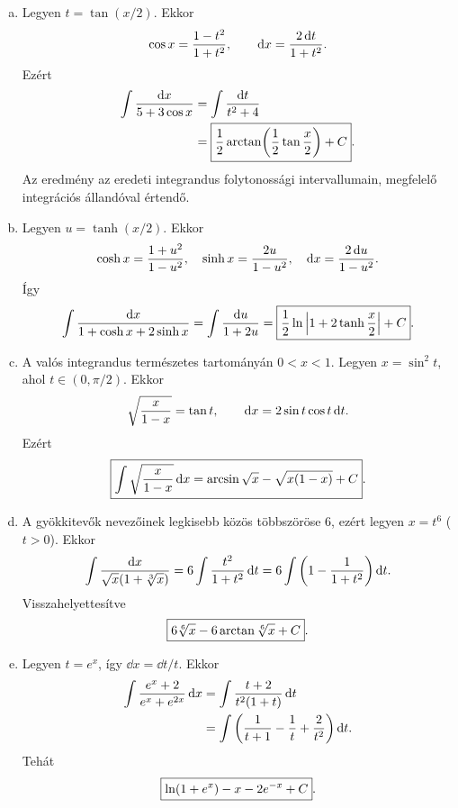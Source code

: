\documentclass{szb-solution}
\begin{document}
\begin{enumerate}[a)]
  \item Legyen $t=\tan(x/2)$. Ekkor
        $$
          \cos x=\frac{1-t^2}{1+t^2},
          \qquad
          \mathop{}\!\mathrm{d} x=\frac{2\mathop{}\!\mathrm{d} t}{1+t^2}
          \text.
        $$
        Ezért
        \begin{align*}
          \int\frac{\mathop{}\!\mathrm{d} x}{5+3\cos x}
          &=\int\frac{\mathop{}\!\mathrm{d} t}{t^2+4}\\
          &=\boxed{\frac12\arctan\!\left(
            \frac12\tan\frac{x}{2}\right)+C}
          \text.
        \end{align*}
        Az eredmény az eredeti integrandus folytonossági intervallumain,
        megfelelő integrációs állandóval értendő.

  \item Legyen $u=\tanh(x/2)$. Ekkor
        $$
          \cosh x=\frac{1+u^2}{1-u^2},
          \quad
          \sinh x=\frac{2u}{1-u^2},
          \quad
          \mathop{}\!\mathrm{d} x=\frac{2\mathop{}\!\mathrm{d} u}{1-u^2}
          \text.
        $$
        Így
        $$
          \int\frac{\mathop{}\!\mathrm{d} x}{1+\cosh x+2\sinh x}
          =\int\frac{\mathop{}\!\mathrm{d} u}{1+2u}
          =\boxed{\frac12\ln\left|1+2\tanh\frac{x}{2}\right|+C}
          \text.
        $$

  \item A valós integrandus természetes tartományán $0<x<1$. Legyen
        $x=\sin^2t$, ahol $t\in(0,\pi/2)$. Ekkor
        $$
          \sqrt{\frac{x}{1-x}}=\tan t,
          \qquad
          \mathop{}\!\mathrm{d} x=2\sin t\cos t\mathop{}\!\mathrm{d} t
          \text.
        $$
        Ezért
        $$
          \boxed{\int\sqrt{\frac{x}{1-x}}\mathop{}\!\mathrm{d} x
          =\arcsin\sqrt x-\sqrt{x(1-x)}+C}
          \text.
        $$

  \item A gyökkitevők nevezőinek legkisebb közös többszöröse $6$, ezért
        legyen $x=t^6$ ($t>0$). Ekkor
        $$
          \int\frac{\mathop{}\!\mathrm{d} x}{\sqrt x(1+\sqrt[3]x)}
          =6\int\frac{t^2}{1+t^2}\mathop{}\!\mathrm{d} t
          =6\int\left(1-\frac1{1+t^2}\right)\mathop{}\!\mathrm{d} t
          \text.
        $$
        Visszahelyettesítve
        $$
          \boxed{6\sqrt[6]x-6\arctan\sqrt[6]x+C}
          \text.
        $$

  \item Legyen $t=e^x$, így $\dd x=\dd t/t$. Ekkor
        \begin{align*}
          \int\frac{e^x+2}{e^x+e^{2x}}\mathop{}\!\mathrm{d} x
          &=\int\frac{t+2}{t^2(1+t)}\mathop{}\!\mathrm{d} t\\
          &=\int\left(\frac1{t+1}-\frac1t+\frac2{t^2}\right)\mathop{}\!\mathrm{d} t
          \text.
        \end{align*}
        Tehát
        $$
          \boxed{\ln(1+e^x)-x-2e^{-x}+C}
          \text.
        $$
\end{enumerate}
\end{document}

